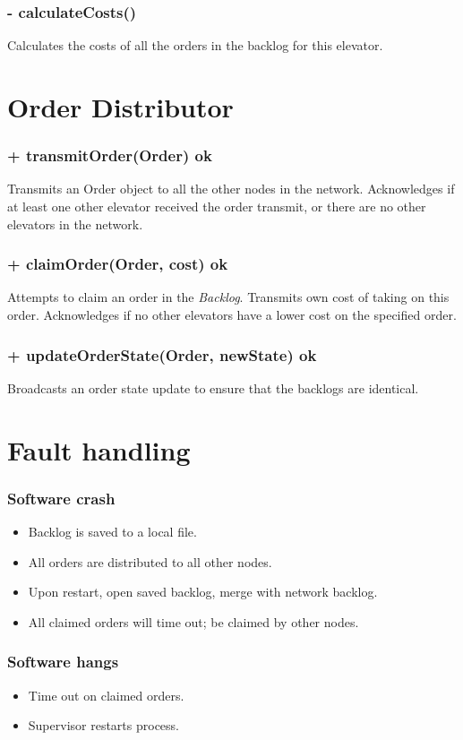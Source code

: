 \documentclass[11pt,a4paper]{article}
\begin{document}
\subsubsection*{- calculateCosts()}
Calculates the costs of all the orders in the backlog for this elevator.
\section*{Order Distributor}
\subsubsection*{+ transmitOrder(Order) ok}
Transmits an Order object to all the other nodes in the network. Acknowledges if at least one other elevator received the order transmit, or there are no other elevators in the network.
\subsubsection*{+ claimOrder(Order, cost) ok}
Attempts to claim an order in the \textit{Backlog}. Transmits own cost of taking on this order. Acknowledges if no other elevators have a lower cost on the specified order.
\subsubsection*{+ updateOrderState(Order, newState) ok}
Broadcasts an order state update to ensure that the backlogs are identical.
\section*{Fault handling}
\subsubsection*{Software crash}
\begin{itemize}
\item Backlog is saved to a local file.
\item All orders are distributed to all other nodes.
\item Upon restart, open saved backlog, merge with network backlog.
\item All claimed orders will time out; be claimed by other nodes.
\end{itemize}
\subsubsection*{Software hangs}
\begin{itemize}
\item Time out on claimed orders.
\item Supervisor restarts process.
\end{itemize}
\end{document}
